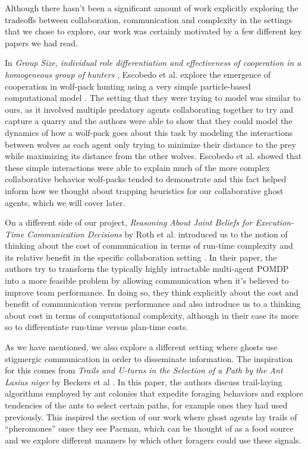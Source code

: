 \documentclass[11pt]{article}
\begin{document}
Although there hasn’t been a significant amount of work explicitly exploring the tradeoffs between collaboration, communication and complexity in the settings that we chose to explore, our work was certainly motivated by a few different key papers we had read. 

In \textit{ Group Size, individual role differentiation and effectiveness of cooperation in a homogeneous group of hunters }, Escobedo et al. explore the emergence of cooperation in wolf-pack hunting using a very simple particle-based computational model \cite{escobedo2014group}. The setting that they were trying to model was similar to ours, as it involved multiple predatory agents collaborating together to try and capture a quarry and the authors were able to show that they could model the dynamics of how a wolf-pack goes about this task by modeling the interactions between wolves as each agent only trying to minimize their distance to the prey while maximizing its distance from the other wolves. Escobedo et al. showed that these simple interactions were able to explain much of the more complex collaborative behavior wolf-packs tended to demonstrate and this fact helped inform how we thought about trapping heuristics for our collaborative ghost agents, which we will cover later.

On a different side of our project, \textit{Reasoning About Joint Beliefs for Execution-Time Communication Decisions } by Roth et al. introduced us to the notion of thinking about the cost of communication in terms of run-time complexity and its relative benefit in the specific collaboration setting \cite{roth2005reasoning}. In their paper, the authors try to transform the typically highly intractable multi-agent POMDP into a more feasible problem by allowing communication when it’s believed to improve team performance. In doing so, they think explicitly about the cost and benefit of communication versus performance and also introduce us to a thinking about cost in terms of computational complexity, although in their case its more so to differentiate run-time versus plan-time costs.

As we have mentioned, we also explore a different setting where ghosts use stigmergic communication in order to disseminate information. The inspiration for this comes from \textit{Trails and U-turns in the Selection of a Path by the Ant Lasius niger} by Beckers et al  \cite{beckers1992trails}. In this paper, the authors discuss trail-laying algorithms employed by ant colonies that expedite foraging behaviors and explore tendencies of the ants to select certain paths, for example ones they had used previously. This inspired the section of our work where ghost agents lay trails of “pheromones” once they see Pacman, which can be thought of as a food source and we explore different manners by which other foragers could use these signals. 
\end{document}
